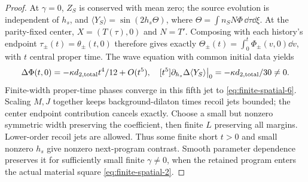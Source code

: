 \begin{proof}
At $\gamma=0$, $Z_S$ is conserved with mean zero; the source evolution
is independent of $h_s$, and $\langle Y_S\rangle=\sin(2h_s\Theta)$,
where $\Theta=\int n_SN\Phi\,\dd\tau\dd\xi$.
At the parity-fixed center, $X=(T(\tau),0)$ and $N=T'$.
Composing with each history's endpoint $\tau_\pm(t)=\theta_\pm(t,0)$
therefore gives exactly $\Theta_\pm(t)=\int_0^t\Phi_\pm(v,0)\dd v$,
with $t$ central proper time. The wave equation with common initial
data yields
\begin{equation}
 \Delta\Phi(t,0)=-\kappa d_{2,\rm total}t^4/12+O(t^5),
 \quad [t^5]\partial_{h_s}\Delta\langle Y_S\rangle\big|_0
       =-\kappa d_{2,\rm total}/30\ne0.                     \label{eq:finite-spatial-6}
\end{equation}
Finite-width proper-time phases converge in this fifth jet to \eqref{eq:finite-spatial-6}.
Scaling $M,J$ together keeps background-dilaton times recoil jets
bounded; the center endpoint contribution cancels exactly. Choose a
small but nonzero symmetric width preserving the coefficient, then
finite $L$ preserving all margins. Lower-order recoil jets are allowed.
Thus some finite short $t>0$ and small nonzero $h_s$ give nonzero
next-program contrast. Smooth parameter dependence preserves it for
sufficiently small finite $\gamma\ne0$, when the retained program
enters the actual material square \eqref{eq:finite-spatial-2}.


\end{proof}
